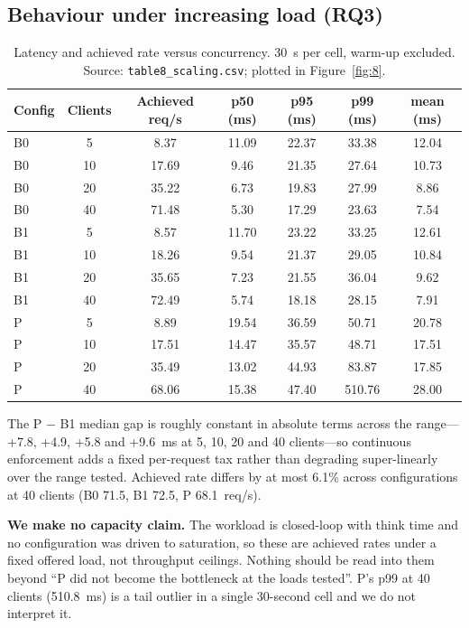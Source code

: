 \subsection{Behaviour under increasing load (RQ3)}

\setcounter{table}{10}
\begin{table}[t]
\centering
\caption{Latency and achieved rate versus concurrency. 30~s per cell, warm-up excluded. Source: \texttt{table8\_scaling.csv}; plotted in Figure~\ref{fig:8}.}
\label{tab:11}
\small
\begin{tabular}{lcccccc}
\toprule
Config & Clients & Achieved req/s & p50 (ms) & p95 (ms) & p99 (ms) & mean (ms) \\
\midrule
B0 & 5 & 8.37 & 11.09 & 22.37 & 33.38 & 12.04 \\
B0 & 10 & 17.69 & 9.46 & 21.35 & 27.64 & 10.73 \\
B0 & 20 & 35.22 & 6.73 & 19.83 & 27.99 & 8.86 \\
B0 & 40 & 71.48 & 5.30 & 17.29 & 23.63 & 7.54 \\
B1 & 5 & 8.57 & 11.70 & 23.22 & 33.25 & 12.61 \\
B1 & 10 & 18.26 & 9.54 & 21.37 & 29.05 & 10.84 \\
B1 & 20 & 35.65 & 7.23 & 21.55 & 36.04 & 9.62 \\
B1 & 40 & 72.49 & 5.74 & 18.18 & 28.15 & 7.91 \\
P & 5 & 8.89 & 19.54 & 36.59 & 50.71 & 20.78 \\
P & 10 & 17.51 & 14.47 & 35.57 & 48.71 & 17.51 \\
P & 20 & 35.49 & 13.02 & 44.93 & 83.87 & 17.85 \\
P & 40 & 68.06 & 15.38 & 47.40 & 510.76 & 28.00 \\
\bottomrule
\end{tabular}
\end{table}

The P $-$ B1 median gap is roughly constant in absolute terms across the range---+7.8, +4.9, +5.8 and +9.6~ms at 5, 10, 20 and 40 clients---so continuous enforcement adds a fixed per-request tax rather than degrading super-linearly over the range tested. Achieved rate differs by at most 6.1\% across configurations at 40 clients (B0 71.5, B1 72.5, P 68.1~req/s).

\textbf{We make no capacity claim.} The workload is closed-loop with think time and no configuration was driven to saturation, so these are achieved rates under a fixed offered load, not throughput ceilings. Nothing should be read into them beyond ``P did not become the bottleneck at the loads tested''. P's p99 at 40 clients (510.8~ms) is a tail outlier in a single 30-second cell and we do not interpret it.

